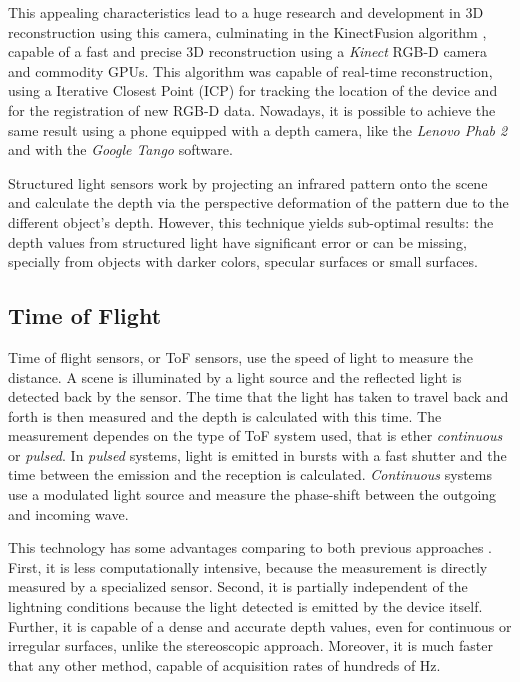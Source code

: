 This appealing characteristics lead to a huge research and development in 3D reconstruction using this camera, culminating in the KinectFusion algorithm \cite{kinectfusion2011}, capable of a fast and precise 3D reconstruction using a \textit{Kinect} RGB-D camera and commodity GPUs. This algorithm was capable of real-time reconstruction, using a Iterative Closest Point (ICP) for tracking the location of the device and for the registration of new RGB-D data. Nowadays, it is possible to achieve the same result using a phone equipped with a depth camera, like the \textit{Lenovo Phab 2} and with the \textit{Google Tango} software. 

Structured light sensors work by projecting an infrared pattern onto the scene and calculate the depth via the perspective deformation of the pattern due to the different object's depth. However, this technique yields sub-optimal results: the depth values from structured light have significant error or can be missing, specially from objects with darker colors, specular surfaces or small surfaces\cite{shen2013}. 

\subsection{Time of Flight}

Time of flight sensors, or ToF sensors, use the speed of light to measure the distance. A scene is illuminated by a light source and the reflected light is detected back by the sensor. The time that the light has taken to travel back and forth is then measured and the depth is calculated with this time. The measurement dependes on the type of ToF system used, that is ether \textit{continuous} or \textit{pulsed}. In \textit{pulsed} systems, light is emitted in bursts with a fast shutter and the time between the emission and the reception is calculated. \textit{Continuous} systems use a modulated light source and measure the phase-shift between the outgoing and incoming wave.

This technology has some advantages comparing to both previous approaches \cite{zollhoefer2018}. First, it is less computationally intensive, because the measurement is directly measured by a specialized sensor. Second, it is partially independent of the lightning conditions because the light detected is emitted by the device itself. Further, it is capable of a dense and accurate depth values, even for continuous or irregular surfaces, unlike the stereoscopic approach. Moreover, it is much faster that any other method, capable of acquisition rates of hundreds of \si{\hertz}.

